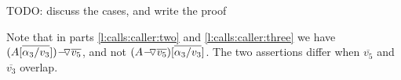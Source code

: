 TODO: discuss the cases, and write the proof

Note that in  parts \ref{l:calls:caller:two} and \ref{l:calls:caller:three} we have ${\PushASLong  {\overline {v_5}}   {{(A[\overline {\alpha_3/v_3}])}}}$, and not $({\PushASLong  {\overline {v_5}}   A})[\overline {\alpha_3/v_3}]$.  The two assertions differ when $\overline {v_5}$ and $\overline {v_3}$ overlap.


%
%
%
%
